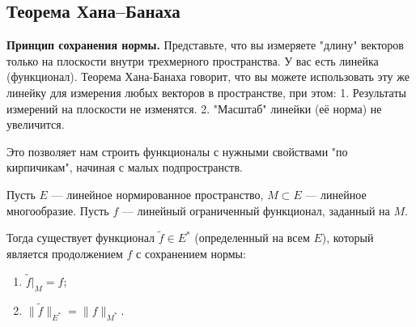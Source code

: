 
\subsection{Теорема Хана--Банаха}

\begin{idea}
	\textbf{Принцип сохранения нормы.}
	Представьте, что вы измеряете "длину" векторов только на плоскости внутри трехмерного пространства. У вас есть линейка (функционал).
	Теорема Хана-Банаха говорит, что вы можете использовать эту же линейку для измерения любых векторов в пространстве, при этом:
	1. Результаты измерений на плоскости не изменятся.
	2. "Масштаб" линейки (её норма) не увеличится.
	
	Это позволяет нам строить функционалы с нужными свойствами "по кирпичикам", начиная с малых подпространств.
\end{idea}

\begin{theorem}\label{Han-Banah}
	Пусть $E$ --- линейное нормированное пространство, $M \subset E$ --- линейное многообразие.
	Пусть $f$ --- линейный ограниченный функционал, заданный на $M$.
	
	Тогда существует функционал $\widetilde{f} \in E^*$ (определенный на всем $E$), который является продолжением $f$ с сохранением нормы:
	\begin{enumerate}
		\item $\widetilde{f}\big|_{M} = f$;
		\item $\|\widetilde{f}\|_{E^*} = \|f\|_{M^*}$.
	\end{enumerate}
\end{theorem}


